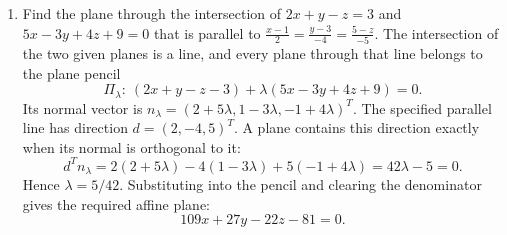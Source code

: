 \begin{enumerate}[leftmargin=4mm,itemsep=9pt]
\[\item Find the shortest distance between $\vec r=(1,2,3)+\lambda(2,3,4)$ and $\vec r=(2,4,5)+\mu(4,6,8)$.
\solution The two direction vectors are parallel, so the distance is the norm of the residual after projecting the point displacement onto their common direction. Let
\[
u=(2,3,4)^T,\qquad w=B-A=(1,2,2)^T.
\]
The orthogonal projector onto $\operatorname{span}\{u\}$ is
\[
P=u(u^Tu)^{-1}u^T=\frac1{29}
\begin{pmatrix}4&6&8\\6&9&12\\8&12&16\end{pmatrix}.
\]
The least-squares coefficient is $(u^Tu)^{-1}u^Tw=16/29$, and the perpendicular residual is
\[
r_\perp=(I-P)w=w-\frac{16}{29}u
=\frac1{29}(-3,10,-6)^T.
\]
Therefore
\[
d=\|r_\perp\|_2
=\frac{\sqrt{9+100+36}}{29}
=\boxed{\frac{\sqrt5}{\sqrt{29}}}.
\]
The residual is orthogonal to $u$, since $u^Tr_\perp=0$, which certifies that the projection is the closest point on the line.

\addtocounter{enumi}{3}
\item Find the plane through the intersection of $2x+y-z=3$ and $5x-3y+4z+9=0$ that is parallel to $\frac{x-1}{2}=\frac{y-3}{-4}=\frac{5-z}{-5}$.
\solution The intersection of the two given planes is a line, and every plane through that line belongs to the plane pencil
\[
\Pi_\lambda:\ (2x+y-z-3)+\lambda(5x-3y+4z+9)=0.
\]
Its normal vector is $n_\lambda=(2+5\lambda,1-3\lambda,-1+4\lambda)^T$. The specified parallel line has direction $d=(2,-4,5)^T$. A plane contains this direction exactly when its normal is orthogonal to it:
\[
d^Tn_\lambda=2(2+5\lambda)-4(1-3\lambda)+5(-1+4\lambda)=42\lambda-5=0.
\]
Hence $\lambda=5/42$. Substituting into the pencil and clearing the denominator gives the required affine plane:
\[
\boxed{109x+27y-22z-81=0}.

\]\]
\end{enumerate}
